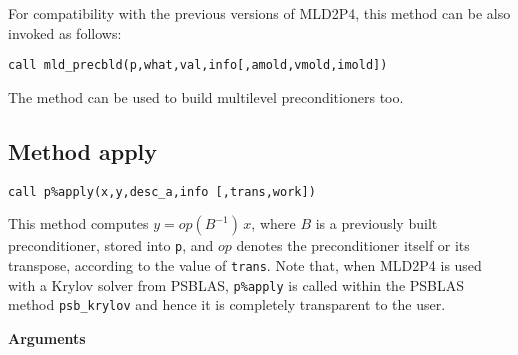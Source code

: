 \baselineskip
For compatibility with the previous versions of MLD2P4, this method can be also invoked
as follows:

\begin{center}
\verb|call mld_precbld(p,what,val,info[,amold,vmold,imold])|
\end{center}

\noindent
The method can be used to build multilevel preconditioners too.


\clearpage
\subsection{Method apply\label{sec:precapply}}

\begin{center}
\verb|call p%apply(x,y,desc_a,info [,trans,work])|\\
\end{center}

\noindent
This method computes $y = op(B^{-1})\, x$, where $B$ is a previously built
preconditioner, stored into \verb|p|, and $op$
denotes the preconditioner itself or its transpose, according to
the value of \verb|trans|.
Note that, when MLD2P4 is used with a Krylov solver from PSBLAS,
\verb|p%apply| is called within the PSBLAS method \verb|psb_krylov|
and hence it is completely transparent to the user.

{\baselineskip\noindent\large\bfseries Arguments} \smallskip


